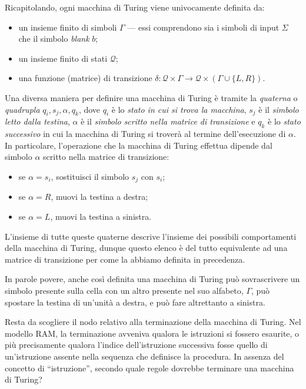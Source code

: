 \documentclass[10pt]{\classname}
\theoremstyle{definition}
\theoremstyle{definition}
\begin{document}
Ricapitolando, ogni macchina di Turing viene univocamente definita da:
\begin{itemize}
    \item un insieme finito di simboli $\Gamma$ --- essi comprendono sia i
        simboli di input $\Sigma$ che il simbolo \emph{blank} $b$;
    \item un insieme finito di stati $\mathcal Q$;
    \item una funzione (matrice) di transizione $\delta  : \mathcal Q \times
        \Gamma \rightarrow \mathcal Q \times (\Gamma \cup \{L,R\})$.
\end{itemize}

Una diversa maniera per definire una macchina di Turing è tramite la
\emph{quaterna} o \emph{quadrupla} $q_i, s_j, \alpha, q_k$, dove $q_i$ è lo
\emph{stato in cui si trova la macchina}, $s_j$ è il \emph{simbolo letto dalla
testina}, $\alpha$ è il \emph{simbolo scritto nella matrice di transizione} e
$q_k$ è lo \emph{stato successivo} in cui la macchina di Turing si troverà al
termine dell'esecuzione di $\alpha$. In particolare, l'operazione che la
macchina di Turing effettua dipende dal simbolo $\alpha$ scritto nella matrice
di transizione:
\begin{itemize}
    \item se $\alpha = s_i$, sostituisci il simbolo $s_j$ con $s_i$;
    \item se $\alpha = R$, muovi la testina a destra;
    \item se $\alpha = L$, muovi la testina a sinistra.
\end{itemize}

L'insieme di tutte queste quaterne descrive l'insieme dei possibili
comportamenti della macchina di Turing, dunque questo elenco è del tutto
equivalente ad una matrice di transizione per come la abbiamo definita in
precedenza.

In parole povere, anche così definita una macchina di Turing può sovrascrivere
un simbolo presente sulla cella con un altro presente nel suo alfabeto,
$\Gamma$, può spostare la testina di un'unità a destra, e può fare altrettanto
a sinistra.

Resta da scogliere il nodo relativo alla terminazione della macchina di Turing.
Nel modello RAM, la terminazione avveniva qualora le istruzioni si fossero
esaurite, o più precisamente qualora l'indice dell'istruzione successiva fosse
quello di un'istruzione assente nella sequenza che definisce la procedura. In
assenza del concetto di ``istruzione'', secondo quale regole dovrebbe terminare
una macchina di Turing? 
\end{document}
